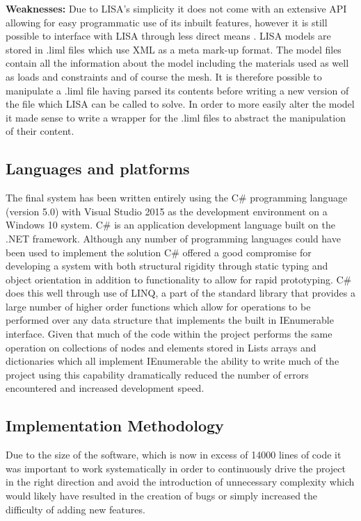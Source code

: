 \documentclass{article}
\begin{document}
\noindent
\textbf{Weaknesses: } Due to LISA’s simplicity it does not come with an extensive API allowing for easy programmatic use of its inbuilt features, however it is still possible to interface with LISA through less direct means \cite{LISAManual}. LISA models are stored in .liml files which use XML as a meta mark-up format. The model files contain all the information about the model including the materials used as well as loads and constraints and of course the mesh. It is therefore possible to manipulate a .liml file having parsed its contents before writing a new version of the file which LISA can be called to solve. In order to more easily alter the model it made sense to write a wrapper  for the .liml files to abstract the manipulation of their content.

\subsection{Languages and platforms}
The final system has been written entirely using the C\# programming language (version 5.0) with Visual Studio 2015 as the development environment on a Windows 10 system. C\# is an application development language built on the .NET framework. Although any number of programming languages could have been used to implement the solution C\# offered a good compromise for developing a system with both structural rigidity through static typing and object orientation in addition to functionality to allow for rapid prototyping. C\# does this well through use of LINQ, a part of the standard library that provides a large number of higher order functions which allow for operations to be performed over any data structure that implements the built in IEnumerable interface. Given that much of the code within the project performs the same operation on collections of nodes and elements stored in Lists arrays and dictionaries which all implement IEnumerable the ability to write much of the project using this capability dramatically reduced the number of errors encountered and increased development speed.


\subsection{Implementation Methodology}
Due to the size of the software, which is now in excess of 14000 lines of code it was important to work systematically in order to continuously drive the project in the right direction and avoid the introduction of unnecessary complexity which would likely have resulted in the creation of bugs or simply increased the difficulty of adding new features.
\end{document}
